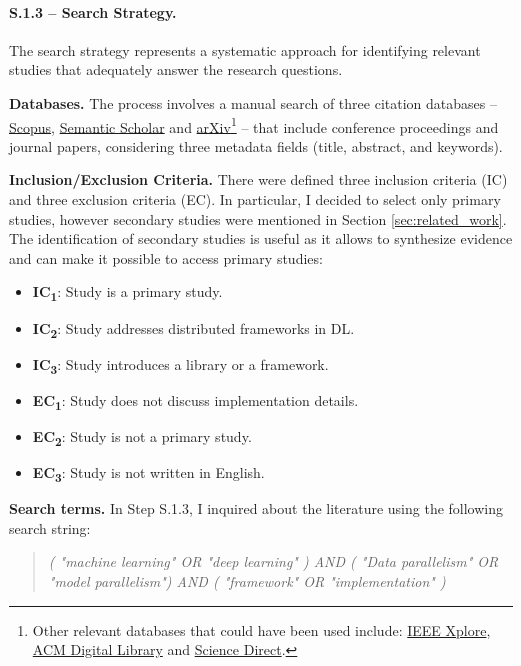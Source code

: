 \paragraph{S.1.3 -- Search Strategy.}
The search strategy represents a systematic approach for identifying relevant studies that
adequately answer the research questions.

\textbf{Databases.}
The process involves a manual search of three citation databases --
\href{https://www.scopus.com/}{Scopus}, \href{https://www.semanticscholar.org/}{Semantic Scholar}
and \href{https://arxiv.org/}{arXiv}\footnote{Other relevant databases that could have been used
	include: \href{https://ieeexplore.ieee.org/}{IEEE Xplore}, \href{https://dl.acm.org/}{ACM Digital
		Library} and \href{https://www.sciencedirect.com/}{Science Direct}.} -- that include conference
proceedings and journal papers, considering three metadata fields (title, abstract, and keywords).

\textbf{Inclusion/Exclusion Criteria.}
There were defined three inclusion criteria (IC) and three exclusion criteria (EC). In particular, I
decided to select only primary studies, however secondary studies were mentioned in Section
\ref{sec:related_work}. The identification of secondary studies is useful as it allows to synthesize
evidence and can make it possible to access primary studies:

\begin{itemize}
	\item \textbf{IC\textsubscript{1}}: Study is a primary study.
	\item \textbf{IC\textsubscript{2}}: Study addresses distributed frameworks in DL.
	\item \textbf{IC\textsubscript{3}}: Study introduces a library or a framework. \\
	\item \textbf{EC\textsubscript{1}}: Study does not discuss implementation details.
	\item \textbf{EC\textsubscript{2}}: Study is not a primary study.
	\item \textbf{EC\textsubscript{3}}: Study is not written in English.
\end{itemize}

\textbf{Search terms.}
In Step S.1.3, I inquired about the literature using the following search string:
\begin{quote}
	\textit{( "machine learning" OR "deep learning" )
		AND
		( "Data parallelism" OR "model parallelism")
		AND
		( "framework" OR "implementation" )}
\end{quote}

